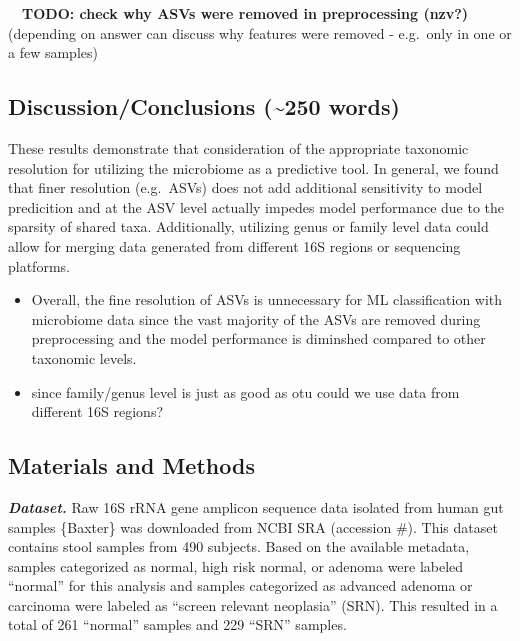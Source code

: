 \documentclass[
]{article}
\providecommand{\tightlist}{%
  \setlength{\itemsep}{0pt}\setlength{\parskip}{0pt}}
\begin{document}
~~\textbf{TODO: check why ASVs were removed in preprocessing (nzv?)}\\
\hspace*{0.333em}\hspace*{0.333em}(depending on answer can discuss why
features were removed - e.g.~only in one or a few samples)

\hypertarget{discussionconclusions-250-words}{%
\subsection{Discussion/Conclusions (\textasciitilde250
words)}\label{discussionconclusions-250-words}}

These results demonstrate that consideration of the appropriate
taxonomic resolution for utilizing the microbiome as a predictive tool.
In general, we found that finer resolution (e.g.~ASVs) does not add
additional sensitivity to model predicition and at the ASV level
actually impedes model performance due to the sparsity of shared taxa.
Additionally, utilizing genus or family level data could allow for
merging data generated from different 16S regions or sequencing
platforms.

\begin{itemize}
\tightlist
\item
  Overall, the fine resolution of ASVs is unnecessary for ML
  classification with microbiome data since the vast majority of the
  ASVs are removed during preprocessing and the model performance is
  diminshed compared to other taxonomic levels.
\item
  since family/genus level is just as good as otu could we use data from
  different 16S regions?
\end{itemize}

\hypertarget{materials-and-methods}{%
\subsection{Materials and Methods}\label{materials-and-methods}}

\textbf{\emph{Dataset.}} Raw 16S rRNA gene amplicon sequence data
isolated from human gut samples \{Baxter\} was downloaded from NCBI SRA
(accession \#). This dataset contains stool samples from 490 subjects.
Based on the available metadata, samples categorized as normal, high
risk normal, or adenoma were labeled ``normal'' for this analysis and
samples categorized as advanced adenoma or carcinoma were labeled as
``screen relevant neoplasia'' (SRN). This resulted in a total of 261
``normal'' samples and 229 ``SRN'' samples.
\end{document}
